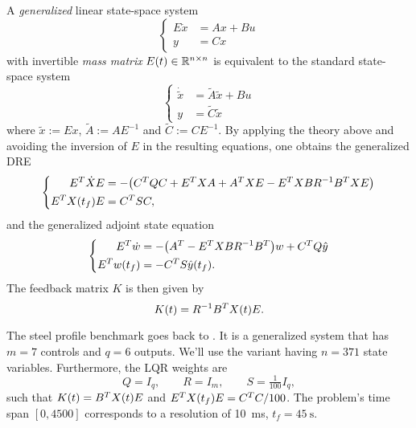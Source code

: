 \begin{remark}
  A \emph{generalized} linear state-space system
  \begin{equation}
  \label{eq:basics:system:generalized}
  \left\{
  \begin{aligned}
    E \dot x &= Ax + Bu \\
    y &= Cx
  \end{aligned}
  \right.
  \end{equation}
  with invertible \emph{mass matrix} $E(t)\in\mathbb{R}^{n\times n}$ is equivalent to the
  standard state-space system
  \begin{equation}
  \left\{
  \begin{aligned}
    \dot{\tilde x} &= \tilde A \tilde x + Bu \\
    y &= \tilde C \tilde x
  \end{aligned}
  \right.
  \end{equation}
  where $\tilde x := E x$, $\tilde A := A E^{-1}$ and $\tilde C := C E^{-1}$.
  By applying the theory above
  and avoiding the inversion of $E$ in the resulting equations,
  one obtains the generalized \ac{DRE}
  \begin{equation}
  \left\{
  \begin{aligned}
    E^T \dot X E &= -\big( C^T Q C + E^T X A + A^T X E - E^T X B R^{-1} B^T X E \big) \\
    E^T X(t_f) E &= C^T S C
    ,
  \end{aligned}
  \right.
  \end{equation}
  and the generalized adjoint state equation
  \begin{equation}
  \left\{
  \begin{aligned}
    E^T \dot w &= - \big( A^T - E^T X B R^{-1} B^T \big) w + C^T Q \hat y \\
    E^T w(t_f) &= - C^T S \hat y(t_f)
    .
  \end{aligned}
  \right.
  \end{equation}
  The feedback matrix $K$ is then given by
  \begin{equation}
    K(t) = R^{-1} B^T X(t) E
    .
  \end{equation}
\end{remark}

\begin{example}
  The steel profile benchmark \cite{morwiki_steel} goes back to \cite{Benner2005}.
  It is a generalized system that has $m=7$ controls and $q=6$ outputs.
  We'll use the variant having $n=371$ state variables.
  Furthermore, the \ac{LQR} weights are
  \begin{equation*}
    Q = I_q,
    \qquad
    R = I_m,
    \qquad
    S = \tfrac{1}{100} I_q,
  \end{equation*}
  such that $K(t) = B^T X(t) E$
  and $E^T X(t_f) E = C^T C /100$.
  The problem's time span $[0,4500]$ corresponds to a resolution of \SI{10}{\milli\second},
  \ie $t_f = \SI{45}{\second}$.
\end{example}

